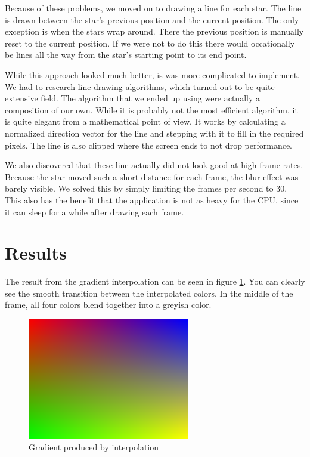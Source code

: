 \documentclass[a4paper]{article}
\begin{document}
Because of these problems, we moved on to drawing a line for each star.
The line is drawn between the star's previous position and the current position.
The only exception is when the stars wrap around.
There the previous position is manually reset to the current position.
If we were not to do this there would occationally be lines all the way from the star's starting point to its end point.

While this approach looked much better, is was more complicated to implement.
We had to research line-drawing algorithms, which turned out to be quite extensive field.
The algorithm that we ended up using were actually a composition of our own.
While it is probably not the most efficient algorithm, it is quite elegant from a mathematical point of view.
It works by calculating a normalized direction vector for the line and stepping with it to fill in the required pixels.
The line is also clipped where the screen ends to not drop performance.

We also discovered that these line actually did not look good at high frame rates.
Because the star moved such a short distance for each frame, the blur effect was barely visible.
We solved this by simply limiting the frames per second to 30.
This also has the benefit that the application is not as heavy for the CPU, since it can sleep for a while after drawing each frame.

\section{Results}
The result from the gradient interpolation can be seen in figure \ref{gradient_fig}.
You can clearly see the smooth transition between the interpolated colors.
In the middle of the frame, all four colors blend together into a greyish color.

\begin{figure}
\begin{center}
\includegraphics[width=200pt]{gradient.png}
\caption{Gradient produced by interpolation}
\label{gradient_fig}
\end{center}
\end{figure}
\end{document}

